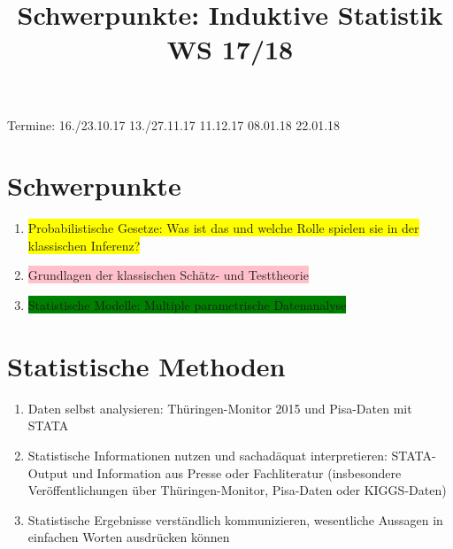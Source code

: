 \documentclass[a4paper,fontsize=16pt]{article}
\title{Schwerpunkte: Induktive Statistik WS 17/18}
\date{\vspace{-10ex}}
\begin{document}
\maketitle

Termine: 
16./23.10.17
13./27.11.17
11.12.17
08.01.18
22.01.18

\section{Schwerpunkte}
\begin{enumerate}
\item{\colorbox{yellow}{Probabilistische Gesetze: Was ist das und welche Rolle spielen sie in der klassischen Inferenz?}}
\item{\colorbox{pink}{Grundlagen der klassischen Schätz- und Testtheorie}}
\item{\colorbox{green}{Statistische Modelle: Multiple parametrische Datenanalyse}}
\end{enumerate}

\section{Statistische Methoden}
\begin{enumerate}
\item{Daten selbst analysieren: Thüringen-Monitor 2015 und Pisa-Daten mit STATA}
\item{Statistische Informationen nutzen und sachadäquat interpretieren: STATA-Output und Information aus Presse oder Fachliteratur (insbesondere Veröffentlichungen über Thüringen-Monitor, Pisa-Daten oder KIGGS-Daten)}
\item{Statistische Ergebnisse verständlich kommunizieren, wesentliche Aussagen in einfachen Worten ausdrücken können}
\end{enumerate}
\end{document}
